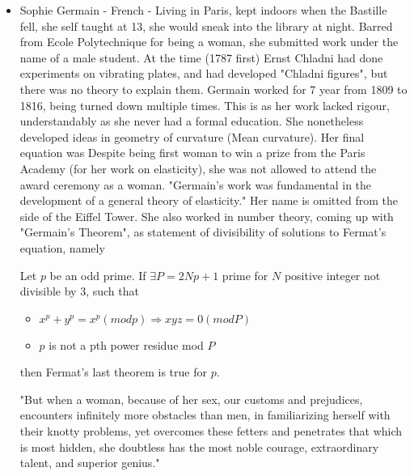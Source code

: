 \documentclass{article}
\begin{document}
\begin{itemize}
    
    \item Sophie Germain - French - Living in Paris, kept indoors when the Bastille fell, she self taught at 13, she would sneak into the library at night. Barred from Ecole Polytechnique for being a woman, she submitted work under the name of a male student. At the time (1787 first) Ernst Chladni had done experiments on vibrating plates, and had developed "Chladni figures", but there was no theory to explain them. Germain worked for 7 year from 1809 to 1816, being turned down multiple times. This is as her work lacked rigour, understandably as she never had a formal education. She nonetheless developed ideas in geometry of curvature (Mean curvature). Her final equation was 
    Despite being first woman to win a prize from the Paris Academy (for her work on elasticity), she was not allowed to attend the award ceremony as a woman. "Germain's work was fundamental in the development of a general theory of elasticity." Her name is omitted from the side of the Eiffel Tower. She also worked in number theory, coming up with "Germain's Theorem", as statement of divisibility of solutions to Fermat's equation, namely
    \begin{theorem}
    Let $p$ be an odd prime. If $\exists P=2Np+1$ prime for $N$ positive integer not divisible by 3, such that 
    \begin{itemize}
        \item $x^p+y^p=x^p (mod p) \Rightarrow xyz = 0 (mod P)$
        \item $p$ is not a pth power residue mod $P$
    \end{itemize}
    then Fermat's last theorem is true for $p$.
    \end{theorem}
    "But when a woman, because of her sex, our customs and prejudices, encounters infinitely more obstacles than men, in familiarizing herself with their knotty problems, yet overcomes these fetters and penetrates that which is most hidden, she doubtless has the most noble courage, extraordinary talent, and superior genius."
    \newline
    

\end{itemize}
\end{document}
